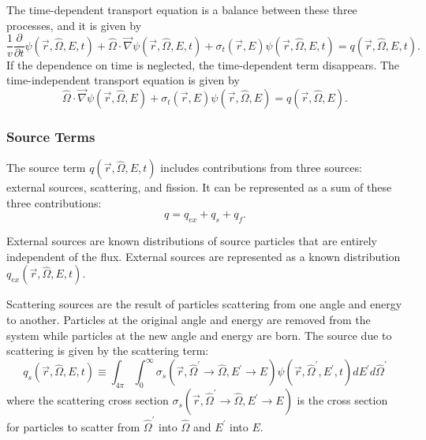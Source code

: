 The time-dependent transport equation is a balance between these three processes, and it is given by
\begin{equation}\label{eq:bg:rt:transport-totsrc-timedep}
  \frac{1}{v}\frac{\partial}{\partial t}\psi\left(\vec{r},\hat{\Omega},E,t\right) +
  \hat{\Omega}\cdot\vec{\nabla}\psi\left(\vec{r},\hat{\Omega},E,t\right) +
  \sigma_t\left(\vec{r},E\right)\psi\left(\vec{r},\hat{\Omega},E,t\right) =
  q\left(\vec{r},\hat{\Omega},E,t\right).
\end{equation}
If the dependence on time is neglected, the time-dependent term disappears. The time-independent transport equation is given by
\begin{equation}\label{eq:bg:rt:transport-totsrc}
  \hat{\Omega}\cdot\vec{\nabla}\psi\left(\vec{r},\hat{\Omega},E\right) +
  \sigma_t\left(\vec{r},E\right)\psi\left(\vec{r},\hat{\Omega},E\right) =
  q\left(\vec{r},\hat{\Omega},E\right).
\end{equation}

\subsubsection{Source Terms}
\label{sec:bg:rt:te:st}

The source term $q\left(\vec{r},\hat{\Omega},E,t\right)$ includes contributions from three sources: external sources, scattering, and fission.
It can be represented as a sum of these three contributions:
\begin{equation}\label{eq:bg:rt:source}
  q = q_{ex} + q_s + q_f.
\end{equation}

External sources are known distributions of source particles that are entirely independent of the flux.
External sources are represented as a known distribution $q_{ex}\left(\vec{r},\hat{\Omega},E,t\right)$.

Scattering sources are the result of particles scattering from one angle and energy to another.
Particles at the original angle and energy are removed from the system while particles at the new angle and energy are born.
The source due to scattering is given by the scattering term:
\begin{equation}\label{eq:bg:rt:scattering-term}
  q_s\left(\vec{r},\hat{\Omega},E,t\right) \equiv
  \int_{4\pi}\int_0^\infty\sigma_s\left(\vec{r},\hat{\Omega}^\prime\rightarrow\hat{\Omega},E^\prime\rightarrow E\right)\psi\left(\vec{r},\hat{\Omega}^\prime,E^\prime,t\right)dE^\prime d\hat{\Omega}^\prime
\end{equation}
where the scattering cross section $\sigma_s\left(\vec{r},\hat{\Omega}^\prime\rightarrow\hat{\Omega},E^\prime\rightarrow E\right)$ is the cross section for particles to scatter from $\hat{\Omega}^\prime$ into $\hat{\Omega}$ and $E^\prime$ into $E$.

